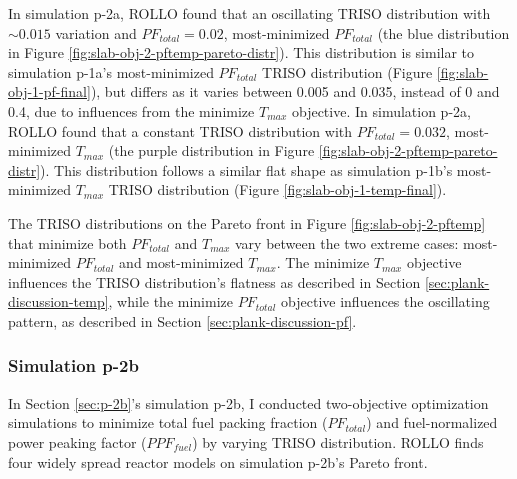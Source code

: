 In simulation p-2a, \gls{ROLLO} found that an oscillating TRISO distribution with 
$\sim0.015$ variation and $PF_{total}=0.02$, most-minimized $PF_{total}$ 
(the blue distribution in Figure \ref{fig:slab-obj-2-pftemp-pareto-distr}). 
This distribution is similar to simulation p-1a's most-minimized $PF_{total}$ TRISO 
distribution (Figure \ref{fig:slab-obj-1-pf-final}), but differs as it varies between 
0.005 and 0.035, instead of 0 and 0.4, due to influences from the minimize $T_{max}$ 
objective. 
In simulation p-2a, \gls{ROLLO} found that a constant TRISO distribution 
with $PF_{total} = 0.032$, most-minimized $T_{max}$ (the purple distribution in 
Figure \ref{fig:slab-obj-2-pftemp-pareto-distr}).
This distribution follows a similar flat shape as simulation p-1b's most-minimized 
$T_{max}$ TRISO distribution (Figure \ref{fig:slab-obj-1-temp-final}).

The \gls{TRISO} distributions on the Pareto front in Figure \ref{fig:slab-obj-2-pftemp} 
that minimize both $PF_{total}$ and $T_{max}$ vary between the two extreme cases: 
most-minimized $PF_{total}$ and most-minimized $T_{max}$. 
The minimize $T_{max}$ objective influences the TRISO distribution's flatness as 
described in Section \ref{sec:plank-discussion-temp}, while 
the minimize $PF_{total}$ objective influences the oscillating pattern, as described 
in Section \ref{sec:plank-discussion-pf}.

\subsubsection{Simulation p-2b}
In Section \ref{sec:p-2b}'s simulation p-2b, I conducted two-objective 
optimization simulations to minimize total fuel packing fraction ($PF_{total}$) and 
fuel-normalized power peaking factor ($PPF_{fuel}$) by varying TRISO distribution. 
\gls{ROLLO} finds four widely spread reactor models on simulation p-2b's Pareto 
front. 

